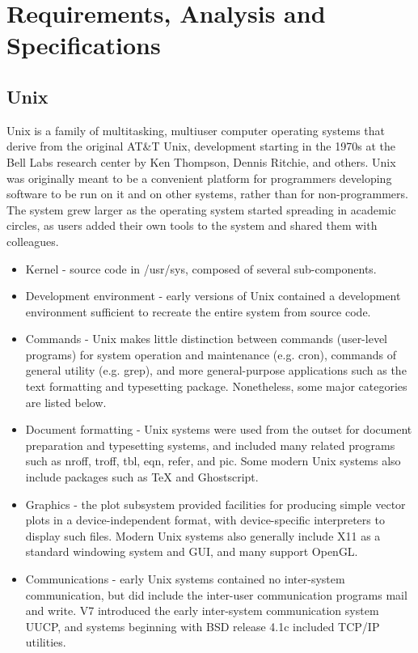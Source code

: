 \chapter{Requirements, Analysis and Specifications}
\section{Unix}
Unix is a family of multitasking, multiuser computer operating systems that derive from the original AT\&T Unix, development starting in the 1970s at the Bell Labs research center by Ken Thompson, Dennis Ritchie, and others.
Unix was originally meant to be a convenient platform for programmers developing software to be run on it and on other systems, rather than for non-programmers. The system grew larger as the operating system started spreading in academic circles, as users added their own tools to the system and shared them with colleagues.
\begin{itemize}
	\item Kernel - source code in /usr/sys, composed of several sub-components.
	\item Development environment - early versions of Unix contained a development environment sufficient to recreate the entire system from source code.
	\item Commands - Unix makes little distinction between commands (user-level programs) for system operation and maintenance (e.g. cron), commands of general utility (e.g. grep), and more general-purpose applications such as the text formatting and typesetting package. Nonetheless, some major categories are listed below.
	\item Document formatting - Unix systems were used from the outset for document preparation and typesetting systems, and included many related programs such as nroff, troff, tbl, eqn, refer, and pic. Some modern Unix systems also include packages such as TeX and Ghostscript.
	\item Graphics - the plot subsystem provided facilities for producing simple vector plots in a device-independent format, with device-specific interpreters to display such files. Modern Unix systems also generally include X11 as a standard windowing system and GUI, and many support OpenGL.
	\item Communications - early Unix systems contained no inter-system communication, but did include the inter-user communication programs mail and write. V7 introduced the early inter-system communication system UUCP, and systems beginning with BSD release 4.1c included TCP/IP utilities.
\end{itemize}
